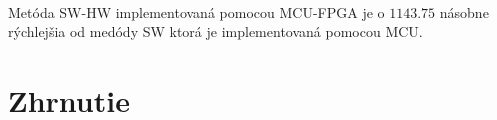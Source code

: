 \documentclass[11pt,a4paper]{article}
\begin{document}
\hfill\\[-3em]

Metóda SW-HW implementovaná pomocou MCU-FPGA je o $1143.75$ násobne rýchlejšia od medódy SW ktorá je implementovaná pomocou MCU.

\section{Zhrnutie}


%
%    
\end{document}
